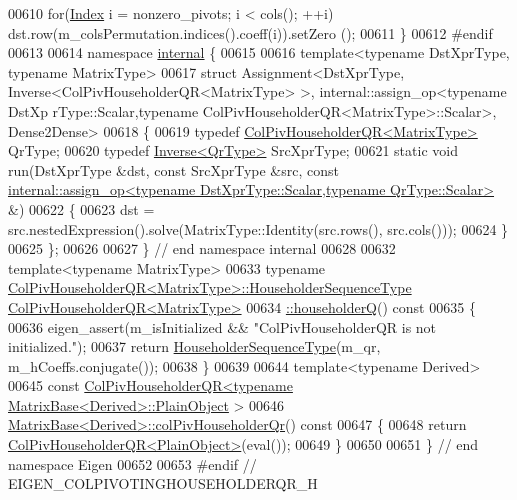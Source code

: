 \begin{DoxyCode}
00610   \textcolor{keywordflow}{for}(\hyperlink{namespace_eigen_a62e77e0933482dafde8fe197d9a2cfde}{Index} i = nonzero\_pivots; i < cols(); ++i) dst.row(m\_colsPermutation.indices().coeff(i)).setZero
      ();
00611 \}
00612 \textcolor{preprocessor}{#endif}
00613 
00614 \textcolor{keyword}{namespace }\hyperlink{namespaceinternal}{internal} \{
00615 
00616 \textcolor{keyword}{template}<\textcolor{keyword}{typename} DstXprType, \textcolor{keyword}{typename} MatrixType>
00617 \textcolor{keyword}{struct }Assignment<DstXprType, Inverse<ColPivHouseholderQR<MatrixType> >, internal::assign\_op<typename DstXp
      rType::Scalar,typename ColPivHouseholderQR<MatrixType>::Scalar>, Dense2Dense>
00618 \{
00619   \textcolor{keyword}{typedef} \hyperlink{group___q_r___module}{ColPivHouseholderQR<MatrixType>} QrType;
00620   \textcolor{keyword}{typedef} \hyperlink{class_eigen_1_1_inverse}{Inverse<QrType>} SrcXprType;
00621   \textcolor{keyword}{static} \textcolor{keywordtype}{void} run(DstXprType &dst, \textcolor{keyword}{const} SrcXprType &src, \textcolor{keyword}{const} 
      \hyperlink{struct_eigen_1_1internal_1_1assign__op}{internal::assign\_op<typename DstXprType::Scalar,typename QrType::Scalar>}
       &)
00622   \{
00623     dst = src.nestedExpression().solve(MatrixType::Identity(src.rows(), src.cols()));
00624   \}
00625 \};
00626 
00627 \} \textcolor{comment}{// end namespace internal}
00628 
00632 \textcolor{keyword}{template}<\textcolor{keyword}{typename} MatrixType>
00633 \textcolor{keyword}{typename} \hyperlink{group___q_r___module_class_eigen_1_1_col_piv_householder_q_r}{ColPivHouseholderQR<MatrixType>::HouseholderSequenceType}
       \hyperlink{group___q_r___module_a28ab9d8916ca609c5469c4c192fbfa28}{ColPivHouseholderQR<MatrixType>}
00634 \hyperlink{group___q_r___module_a28ab9d8916ca609c5469c4c192fbfa28}{  ::householderQ}()\textcolor{keyword}{ const}
00635 \textcolor{keyword}{}\{
00636   eigen\_assert(m\_isInitialized && \textcolor{stringliteral}{"ColPivHouseholderQR is not initialized."});
00637   \textcolor{keywordflow}{return} \hyperlink{group___householder___module_class_eigen_1_1_householder_sequence}{HouseholderSequenceType}(m\_qr, m\_hCoeffs.conjugate());
00638 \}
00639 
00644 \textcolor{keyword}{template}<\textcolor{keyword}{typename} Derived>
00645 \textcolor{keyword}{const} \hyperlink{group___q_r___module_class_eigen_1_1_col_piv_householder_q_r}{ColPivHouseholderQR<typename MatrixBase<Derived>::PlainObject}
      >
00646 \hyperlink{group___core___module_adee8c19c833245bbb00a591dce68e8a4}{MatrixBase<Derived>::colPivHouseholderQr}()\textcolor{keyword}{ const}
00647 \textcolor{keyword}{}\{
00648   \textcolor{keywordflow}{return} \hyperlink{group___q_r___module_class_eigen_1_1_col_piv_householder_q_r}{ColPivHouseholderQR<PlainObject>}(eval());
00649 \}
00650 
00651 \} \textcolor{comment}{// end namespace Eigen}
00652 
00653 \textcolor{preprocessor}{#endif // EIGEN\_COLPIVOTINGHOUSEHOLDERQR\_H}
\end{DoxyCode}

